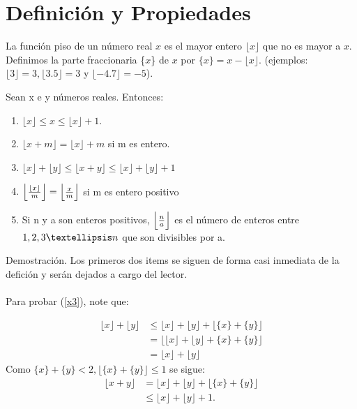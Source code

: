 \section{Definici\'on y Propiedades}
	\begin{df}
	La funci\'on piso de un n\'umero real $x$ es el mayor entero $\lfloor x \rfloor$ que no es mayor a $x$. Definimos la parte fraccionaria \{$x$\} de $x$ por $\{x\}=x-\lfloor x \rfloor$. (ejemplos: $\lfloor3\rfloor=3,  \lfloor3.5\rfloor=3$ y  $\lfloor-4.7\rfloor=-5$).	
	\end{df}
	\begin{thm}
		Sean x e y n\'umeros reales. Entonces:
		\begin{enumerate}
			\item $\lfloor x \rfloor \leq x \leq \lfloor x \rfloor +1$.\label{x1}
			\item $\lfloor x+m \rfloor = \lfloor x \rfloor +m$ si m es entero.\label{x2}
			\item $\lfloor x \rfloor + \lfloor y \rfloor \leq \lfloor x+y \rfloor \leq  \lfloor x \rfloor + \lfloor y \rfloor +1$ \label{x3}
			\item $\Bigl\lfloor \frac{\lfloor x \rfloor}{m} \Bigr\rfloor = \Bigl\lfloor \frac{x}{m} \Bigr\rfloor$ si m es entero positivo\label{x4}
			\item Si n y a son enteros positivos, $\Bigl\lfloor \frac{n}{a} \Bigr\rfloor$ es el n\'umero de enteros entre $1,2,3 \textellipsis n$ que son divisibles por a.\label{x5}
		\end{enumerate}
		Demostraci\'on. Los primeros dos items se siguen de forma casi inmediata de la defici\'on y ser\'an dejados a cargo del lector.
		\\
		\\
		Para probar (\ref{x3}), note que:
		
		\begin{align*}
		\lfloor x \rfloor + \lfloor y \rfloor &\leq \lfloor x \rfloor + \lfloor y \rfloor + \lfloor \{x\} + \{y\} \rfloor \\
		&=\bigl\lfloor\lfloor x \rfloor + \lfloor y \rfloor +\{x\}+\{y\}  \bigr\rfloor \\
		&=\lfloor x \rfloor + \lfloor y \rfloor    
		\end{align*}
		Como $\{x\} + \{y\} < 2, \lfloor \{x\}+\{y\} \rfloor \leq 1$ se sigue:
		\begin{align*}
		\lfloor x + y \rfloor &= \lfloor x \rfloor + \lfloor y \rfloor + \lfloor \{x\} + \{y\} \rfloor \\
		& \leq \lfloor x \rfloor +	\lfloor y \rfloor +1.
		\end{align*} 
		

\end{thm}
